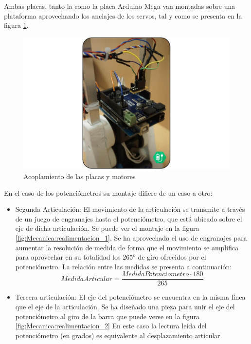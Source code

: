     Ambas placas, tanto la  como la placa Arduino Mega van montadas sobre una plataforma aprovechando los anclajes de los servos, tal y como se presenta en la figura \ref{fig:Electronica:placas}.
    \\
   	\begin{figure}[H]
   		\centering
   		\includegraphics[width=\textwidth]{figuras/Imagenes_Electronica/foto_brazo_11.jpg}
   		\caption{Acoplamiento de las placas y motores}
   		\label{fig:Electronica:placas}
   	\end{figure}
   	
    En el caso de los potenciómetros su montaje difiere de un caso a otro:
    \begin{itemize}
        \item Segunda Articulación: El movimiento de la articulación se transmite a través de un juego de engranajes hasta el potenciómetro, que está ubicado sobre el eje de dicha articulación. Se puede ver el montaje en la figura \ref{fig:Mecanica:realimentacion_1}. Se ha aprovechado el uso de engranajes para aumentar la resolución de medida de forma que el movimiento se amplifica para aprovechar en su totalidad los $265^o$ de giro ofrecidos por el potenciómetro. La relación entre las medidas se presenta a continuación:
        \begin{equation}
        	Medida Articular = \frac{Medida Potenciometro \cdot 180}{265}
        \end{equation}
        \item Tercera articulación: El eje del potenciómetro se encuentra en la misma línea que el eje de la articulación. Se ha diseñado una pieza para unir el eje del potenciómetro al giro de la barra que puede verse en la figura \ref{fig:Mecanica:realimentacion_2} En este caso la lectura leída del potenciómetro (en grados) es equivalente al desplazamiento articular.
    \end{itemize}

